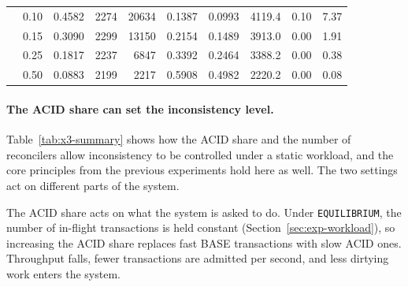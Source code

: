 \begin{table}[htbp]
\begin{tabular}{r r r r r r r r r r}
                           & 0.10                           & 0.4582                         & 2274
                           & 20634                          & 0.1387                         & 0.0993
                           & 4119.4                         & 0.10
                           & 7.37                                                                     \\
                           & 0.15                           & 0.3090                         & 2299
                           & 13150                          & 0.2154                         & 0.1489
                           & 3913.0                         & 0.00
                           & 1.91                                                                     \\
                           & 0.25                           & 0.1817                         & 2237
                           & 6847                           & 0.3392                         & 0.2464
                           & 3388.2                         & 0.00
                           & 0.38                                                                     \\
                           & 0.50                           & 0.0883                         & 2199
                           & 2217                           & 0.5908                         & 0.4982
                           & 2220.2                         & 0.00
                           & 0.08                                                                     \\
    \bottomrule
  \end{tabular}
\end{table}

\paragraph{The ACID share can set the inconsistency level.}
Table~\ref{tab:x3-summary} shows how the ACID share and the
number of reconcilers allow inconsistency to be controlled under a static
workload, and the core principles from the previous experiments hold here as
well. The two settings act on different parts of the system.

The ACID share acts on what the system is asked to do. Under
\texttt{EQUILIBRIUM}, the number of in-flight transactions is held constant
(Section~\ref{sec:exp-workload}), so increasing the ACID share replaces fast
BASE transactions with slow ACID ones. Throughput falls, fewer transactions are
admitted per second, and less dirtying work enters the system.


